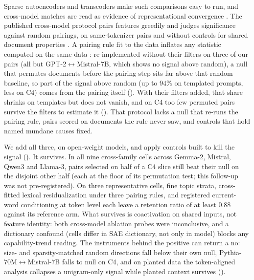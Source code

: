 Sparse autoencoders and transcoders \citep{cunningham2023sparse,bricken2023monosemanticity,
ameisen2025attribution,lindsey2025biology} make such comparisons easy to run, and cross-model
matches are read as evidence of representational convergence
\citep{huh2024platonic,lan2024universal}. The published cross-model protocol pairs features
greedily and judges significance against random pairings, on same-tokenizer pairs and without
controls for shared document properties \citep{lan2024universal}. A pairing rule fit to the data inflates any statistic
computed on the same data \citep{kriegeskorte2009circular}: re-implemented without their
filters on three of our pairs (all but GPT-2$\leftrightarrow$Mistral-7B, which shows no signal above random), a null that permutes documents before the pairing step sits far above that random
baseline, so part of the signal above random (up to $94\%$ on templated prompts, less on C4) comes
from the pairing itself (). With their filters added, that share shrinks on templates
but does not vanish, and on C4 too few permuted pairs survive the filters to estimate it
(). That protocol lacks a null that re-runs the pairing
rule, pairs scored on documents the rule never saw, and controls that hold named mundane causes fixed.

We add all three, on open-weight models, and apply controls built to kill the signal
(). It survives. In all nine cross-family cells across Gemma-2, Mistral, Qwen3
and Llama-3, pairs selected on half of a C4 slice still beat their null on the disjoint other
half (each at the floor of its permutation test; this follow-up was not pre-registered). On three representative
cells, fine topic strata, cross-fitted lexical residualization under three pairing rules, and
registered current-word conditioning at token level each leave a retention ratio of at least
$0.88$ against its reference arm. What survives is coactivation on shared inputs, not feature
identity: both cross-model ablation probes were inconclusive, and a dictionary confound (cells differ
in SAE dictionary, not only in model) blocks any capability-trend reading. The instruments
behind the positive can return a no: size- and sparsity-matched random directions fall below
their own null, Pythia-70M$\leftrightarrow$Mistral-7B falls to null on C4, and on
planted data the token-aligned analysis collapses a unigram-only signal while planted context
survives ().

